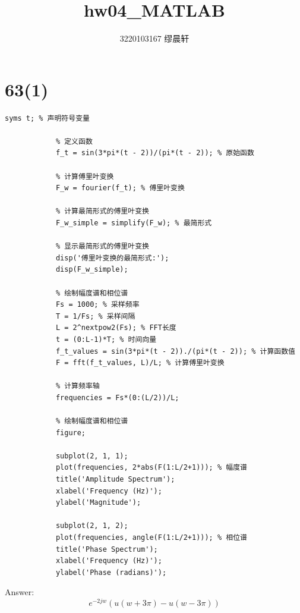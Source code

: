 \documentclass{article}
\title{hw04\_MATLAB}
\author{3220103167 缪晨轩}
\date{\zhdate{2024/3/21}}
\begin{document}
\maketitle
    \section*{63(1)}
        \begin{lstlisting}[caption={题63(1)MATLAB代码}, label={lst:matlab}]
            syms t; % 声明符号变量

            % 定义函数
            f_t = sin(3*pi*(t - 2))/(pi*(t - 2)); % 原始函数

            % 计算傅里叶变换
            F_w = fourier(f_t); % 傅里叶变换

            % 计算最简形式的傅里叶变换
            F_w_simple = simplify(F_w); % 最简形式

            % 显示最简形式的傅里叶变换
            disp('傅里叶变换的最简形式:');
            disp(F_w_simple);

            % 绘制幅度谱和相位谱
            Fs = 1000; % 采样频率
            T = 1/Fs; % 采样间隔
            L = 2^nextpow2(Fs); % FFT长度
            t = (0:L-1)*T; % 时间向量
            f_t_values = sin(3*pi*(t - 2))./(pi*(t - 2)); % 计算函数值
            F = fft(f_t_values, L)/L; % 计算傅里叶变换

            % 计算频率轴
            frequencies = Fs*(0:(L/2))/L;

            % 绘制幅度谱和相位谱
            figure;

            subplot(2, 1, 1);
            plot(frequencies, 2*abs(F(1:L/2+1))); % 幅度谱
            title('Amplitude Spectrum');
            xlabel('Frequency (Hz)');
            ylabel('Magnitude');

            subplot(2, 1, 2);
            plot(frequencies, angle(F(1:L/2+1))); % 相位谱
            title('Phase Spectrum');
            xlabel('Frequency (Hz)');
            ylabel('Phase (radians)');

        \end{lstlisting}
        Answer: \[{e^{ - 2jw}}\left( {u\left( {w + 3\pi } \right) - u\left( {w - 3\pi } \right)} \right)\]
\end{document}
